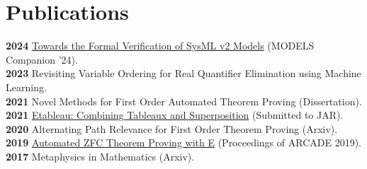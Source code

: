 \documentclass[10pt, letterpaper]{article}
\newcommand{\years}[1]{\textbf{#1}\hspace{1em}}
\begin{document}
\section*{Publications}
\years{2024}  \href{https://dl.acm.org/doi/10.1145/3652620.3687820}{Towards the Formal Verification of SysML v2 Models} (MODELS Companion '24).\\
\years{2023}  Revisiting Variable Ordering for Real Quantifier Elimination using Machine Learning.\\
\years{2021}  Novel Methods for First Order Automated Theorem Proving (Dissertation).\\
\years{2021}  \href{https://github.com/hesterj/Etableau}{Etableau:  Combining Tableaux and Superposition} (Submitted to JAR).\\
\years{2020}  Alternating Path Relevance for First Order Theorem Proving (Arxiv).\\
\years{2019}  \href{https://arxiv.org/abs/1902.00818}{Automated ZFC Theorem Proving with E} (Proceedings of ARCADE 2019).\\
\years{2017}  Metaphysics in Mathematics (Arxiv).\\

\end{document}

